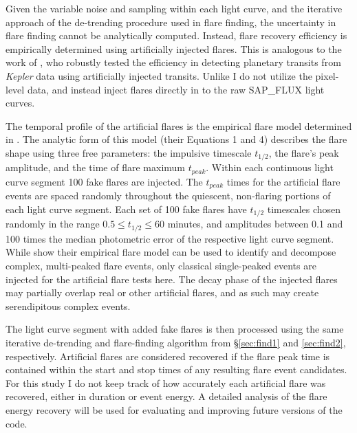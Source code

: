 \documentclass[twocolumn]{aastex6}
\newcommand{\Kepler}{\textsl{Kepler}\xspace}
\begin{document}
Given the variable noise and sampling within each light curve, and the iterative approach of the de-trending procedure used in flare finding, the uncertainty in flare finding cannot be analytically computed. Instead, flare recovery efficiency is empirically determined using artificially injected flares. 
This is analogous to the work of \citet{christiansen2013}, who robustly tested the efficiency in detecting planetary transits from \Kepler data using artificially injected transits. Unlike \citet{christiansen2013} I do not utilize the pixel-level data, and instead inject flares directly in to the raw SAP\_FLUX light curves.

The temporal profile of the artificial flares is the empirical flare model determined in \citet{davenport2014b}. The analytic form of this model (their Equations 1 and 4) describes the flare shape using three free parameters: the impulsive timescale $t_{1/2}$, the flare's peak amplitude, and the time of flare maximum $t_{peak}$.
Within each continuous light curve segment 100 fake flares are injected. The $t_{peak}$ times for the artificial flare events are spaced randomly throughout the quiescent, non-flaring portions of each light curve segment. Each set of 100 fake flares have $t_{1/2}$ timescales chosen randomly in the range $0.5 \le t_{1/2} \le 60$ minutes, and amplitudes between 0.1 and 100 times the median photometric error of the respective light curve segment. While \citet{davenport2014b} show their empirical flare model can be used to identify and decompose complex, multi-peaked flare events, only classical single-peaked events are injected for the artificial flare tests here. The decay phase of the injected flares may partially overlap real or other artificial flares, and as such may create serendipitous complex events.

The light curve segment with added fake flares is then processed using the same iterative de-trending and flare-finding algorithm from \S\ref{sec:find1} and \ref{sec:find2}, respectively. Artificial flares are considered recovered if the flare peak time is contained within the start and stop times of any resulting flare event candidates. For this study I do not keep track of how accurately each artificial flare was recovered, either in duration or event energy. A detailed analysis of the flare energy recovery will be used for evaluating and improving future versions of the code.
\end{document}
